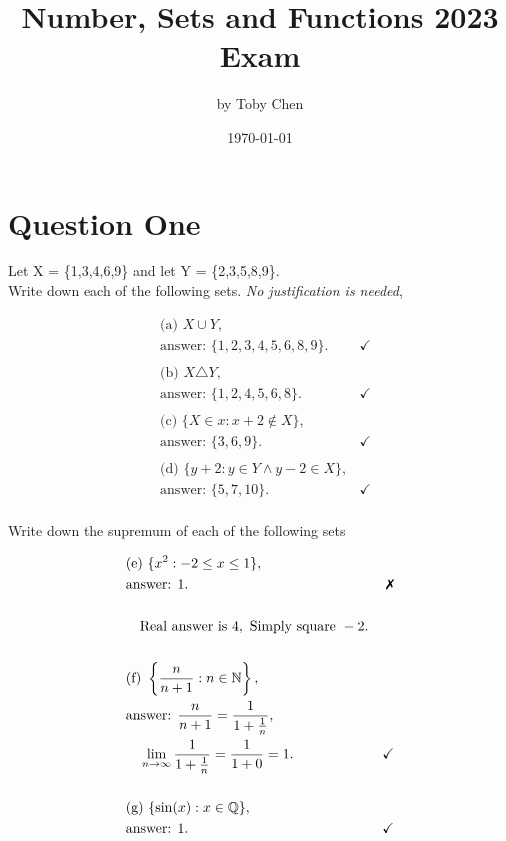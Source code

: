 \documentclass{article}
\title{Number, Sets and Functions 2023 Exam}
\author{by Toby Chen}
\date{\today}
\begin{document}
    \maketitle

    \tableofcontents

    \section{Question One}
        Let X = \{1,3,4,6,9\} and let Y = \{2,3,5,8,9\}.\\ Write down each of the following sets. \textit{No justification is needed},

        \begin{align*}
            &\text{(a) } X\cup Y,\\
            &\text{answer: } \{1,2,3,4,5,6,8,9\}. &\checkmark\\
            &\\
            &\text{(b) }X\triangle Y,\\
            &\text{answer: } \{1,2,4,5,6,8\}. &\checkmark\\
            &\\
            &\text{(c) } \{X\in x: x+2 \notin X\},\\
            &\text{answer: } \{3,6,9\}. &\checkmark\\
            &\\
            &\text{(d) } \{y+2 : y\in Y \land y-2 \in X\},\\
            &\text{answer: } \{5,7,10\}. &\checkmark\\
        \end{align*}

        Write down the supremum of each of the following sets

        \begin{align*}
            &\text{(e) } \{x^2 : -2 \leq x \leq 1\},\\
            &\text{answer: } 1.&\xmark\\
            &\\
            &\quad\text{Real answer is }4, \text{ Simply square }-2.\\
            &\\
            &\text{(f) } \left\{\frac{n}{n+1}: n \in \mathbb{N}\right\},\\
            &\text{answer: } \frac{n}{n+1} = \frac{1}{1 + \frac{1}{n}},\\
            &\quad\lim_{n\rightarrow \infty}\frac{1}{1 + \frac{1}{n}} = \frac{1}{1 + 0} = 1.&\checkmark\\
            &\\
            &\text{(g) } \{\sin(x) : x\in \mathbb{Q}\},\\
            &\text{answer: }1. &\checkmark\\
        \end{align*}
\end{document}
